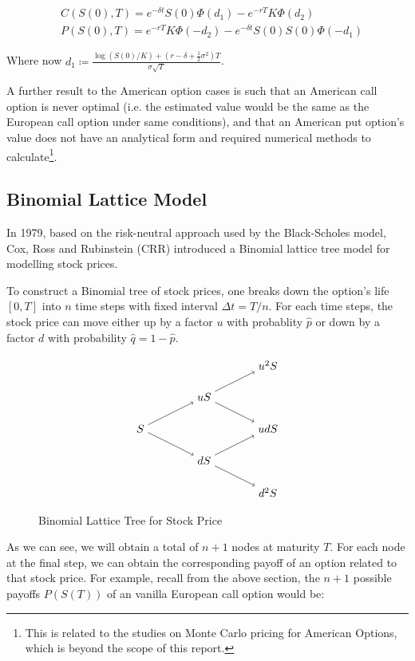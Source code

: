 \begin{align}
	&C(S(0), T) = e^{-\delta t}S(0)\Phi(d_1) - e^{-rT}K\Phi(d_2) \\
	&P(S(0), T) = e^{-rT}K\Phi(-d_2) - e^{-\delta t}S(0)S(0)\Phi(-d_1)
\end{align}

Where now $d_1 \coloneqq \frac{\log(S(0)/K)+(r-\delta+\frac{1}{2}\sigma^2)T}{\sigma\sqrt{T}}$.

A further result to the American option cases is such that an American call option is never optimal (i.e. the estimated value would be the same as the European call option under same conditions), and that an American put option's value does not have an analytical form and required numerical methods to calculate\footnote{This is related to the studies on Monte Carlo pricing for American Options, which is beyond the scope of this report.}.

\subsection{Binomial Lattice Model}

In 1979, based on the risk-neutral approach used by the Black-Scholes model, Cox, Ross and Rubinstein (CRR) \cite{CRR1979} introduced a Binomial lattice tree model for modelling stock prices.

To construct a Binomial tree of stock prices, one breaks down the option's life $[0,T]$ into $n$ time steps with fixed interval $\Delta t=T/n$. For each time steps, the stock price can move either up by a factor $u$ with probablity $\hat{p}$ or down by a factor $d$ with probability $\hat{q}=1-\hat{p}$.

\begin{figure}[ht] \label{gph:binomial_tree}
    \centering
    \[\tikz{
        \node (a) at (0, 2) {$S$};
        \node (b) at (2, 3) {$uS$};
        \node (c) at (2, 1) {$dS$};
		\node (d) at (4, 4) {$u^2S$};
        \node (e) at (4, 2) {$udS$};
		\node (f) at (4, 0) {$d^2S$};
        \path[->] (a) edge (b);
        \path[->] (a) edge (c);
		\path[->] (b) edge (d);
        \path[->] (b) edge (e);
		\path[->] (c) edge (e);
        \path[->] (c) edge (f);
    }\]
    \caption{Binomial Lattice Tree for Stock Price}
\end{figure}

As we can see, we will obtain a total of $n+1$ nodes at maturity $T$. For each node at the final step, we can obtain the corresponding payoff of an option related to that stock price. For example, recall from the above section, the $n+1$ possible payoffs $P(S(T))$ of an vanilla European call option would be:

